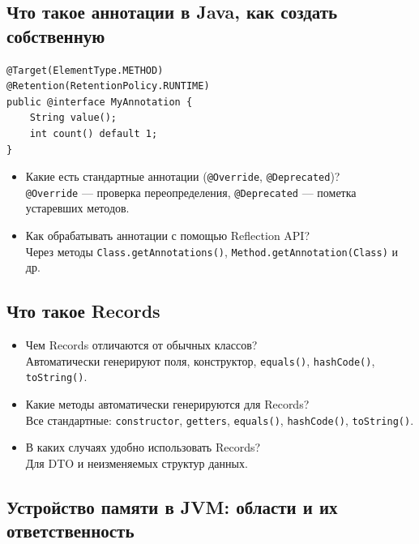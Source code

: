 \documentclass[a4paper,14pt]{article}
\begin{document}
\subsection{Что такое аннотации в Java, как создать собственную}
\begin{lstlisting}[style=javastyle]
@Target(ElementType.METHOD)
@Retention(RetentionPolicy.RUNTIME)
public @interface MyAnnotation {
    String value();
    int count() default 1;
}
\end{lstlisting}    

\begin{itemize}
\item Какие есть стандартные аннотации (\texttt{@Override}, \texttt{@Deprecated})? \\
\texttt{@Override} — проверка переопределения, \texttt{@Deprecated} — пометка устаревших методов.


\item Как обрабатывать аннотации с помощью Reflection API? \\
Через методы \texttt{Class.getAnnotations()}, \texttt{Method.getAnnotation(Class)} и др.


\end{itemize}

\subsection{Что такое Records}

\begin{itemize}
\item Чем Records отличаются от обычных классов? \\
Автоматически генерируют поля, конструктор, \texttt{equals()}, \texttt{hashCode()}, \texttt{toString()}.


\item Какие методы автоматически генерируются для Records? \\
Все стандартные: \texttt{constructor}, \texttt{getters}, \texttt{equals()}, \texttt{hashCode()}, \texttt{toString()}.

\item В каких случаях удобно использовать Records? \\
Для DTO и неизменяемых структур данных.


\end{itemize}
\subsection{Устройство памяти в JVM: области и их ответственность}
\end{document}
